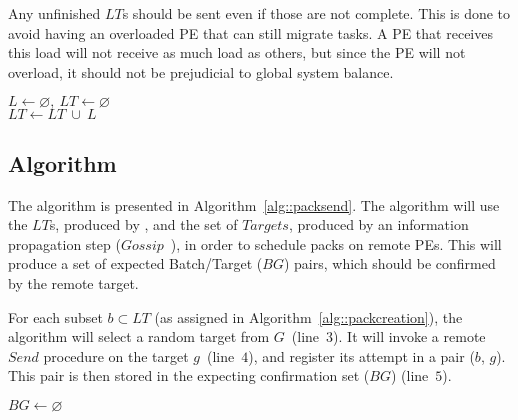 Any unfinished $LT$s should be sent even if those are not complete.
This is done to avoid having an overloaded PE that can still migrate tasks.
A PE that receives this load will not receive as much load as others, but since the PE will not overload, it should not be prejudicial to global system balance.

\begin{algorithm}[b]
    \DontPrintSemicolon
    $L \gets \varnothing,\ LT \gets \varnothing$ \\
    $LT \gets LT\ \cup\ L$   
    \caption{\batchassembly} 
    \label{alg::packcreation}
\end{algorithm}

\subsection{\batchsend Algorithm} \label{sec:algo:sending}

The \batchsend algorithm is presented in Algorithm~\ref{alg::packsend}.
The algorithm will use the $LT$s, produced by \batchassembly, and the set of $Targets$, produced by an information propagation step ($Gossip$~\cite{gossip}), in order to schedule packs on remote PEs.
This will produce a set of expected Batch/Target ($BG$) pairs, which should be confirmed by the remote target.

For each subset $b \subset LT$ (as assigned in Algorithm~\ref{alg::packcreation}), the algorithm will select a random target from $G$~(line~$3$).
It will invoke a remote $Send$ procedure on the target $g$~(line~$4$), and register its attempt in a pair ($b$, $g$).
This pair is then stored in the expecting confirmation set ($BG$) (line~$5$).

\begin{algorithm}[t]
    \DontPrintSemicolon
    $BG \gets \varnothing$ \\
    \caption{\batchsend}  
    \label{alg::packsend}
\end{algorithm}

